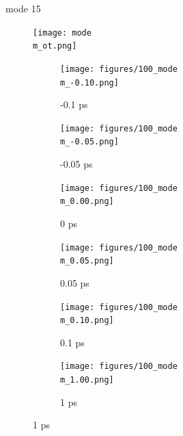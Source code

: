 \documentclass{beamer}
\newcommand\w{0.32}
\begin{document}
\renewcommand\m{15}
\begin{frame}{mode \m}
			\vspace{\vh mm}
	\begin{figure}
		\centering
		\texttt{[image: mode\\m\_ot.png]}
	\end{figure}
	\begin{figure}
		\centering
		\begin{subfigure}[b]{\w\textwidth}
			\centering
			\texttt{[image: figures/100\_mode\\m\_-0.10.png]}
			\caption{-0.1 ps}
		\end{subfigure}
		\begin{subfigure}[b]{\w\textwidth}
			\centering
			\texttt{[image: figures/100\_mode\\m\_-0.05.png]}
			\caption{-0.05 ps}
		\end{subfigure}
		\begin{subfigure}[b]{\w\textwidth}
			\centering
			\texttt{[image: figures/100\_mode\\m\_0.00.png]}
			\caption{0 ps}
		\end{subfigure}
		\begin{subfigure}[b]{\w\textwidth}
			\centering
			\texttt{[image: figures/100\_mode\\m\_0.05.png]}
			\caption{0.05 ps}
		\end{subfigure}
		\begin{subfigure}[b]{\w\textwidth}
			\centering
			\texttt{[image: figures/100\_mode\\m\_0.10.png]}
			\caption{0.1 ps}
		\end{subfigure}
		\begin{subfigure}[b]{\w\textwidth}
			\centering
			\texttt{[image: figures/100\_mode\\m\_1.00.png]}
			\caption{1 ps}
		\end{subfigure}
	\end{figure}
\end{frame}
\end{document}
